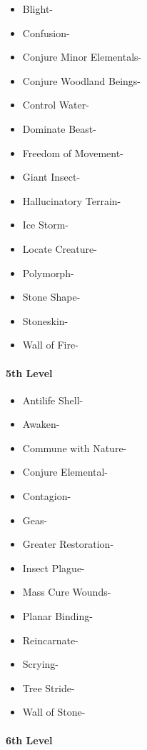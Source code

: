 \documentclass[
]{article}
\providecommand{\tightlist}{%
  \setlength{\itemsep}{0pt}\setlength{\parskip}{0pt}}
\begin{document}
\begin{itemize}
\tightlist
\item
  Blight-
\item
  Confusion-
\item
  Conjure Minor Elementals-
\item
  Conjure Woodland Beings-
\item
  Control Water-
\item
  Dominate Beast-
\item
  Freedom of Movement-
\item
  Giant Insect-
\item
  Hallucinatory Terrain-
\item
  Ice Storm-
\item
  Locate Creature-
\item
  Polymorph-
\item
  Stone Shape-
\item
  Stoneskin-
\item
  Wall of Fire-
\end{itemize}

\hypertarget{5th-level-2}{%
\paragraph{5th Level}\label{5th-level-2}}

\begin{itemize}
\tightlist
\item
  Antilife Shell-
\item
  Awaken-
\item
  Commune with Nature-
\item
  Conjure Elemental-
\item
  Contagion-
\item
  Geas-
\item
  Greater Restoration-
\item
  Insect Plague-
\item
  Mass Cure Wounds-
\item
  Planar Binding-
\item
  Reincarnate-
\item
  Scrying-
\item
  Tree Stride-
\item
  Wall of Stone-
\end{itemize}

\hypertarget{6th-level-2}{%
\paragraph{6th Level}\label{6th-level-2}}
\end{document}
